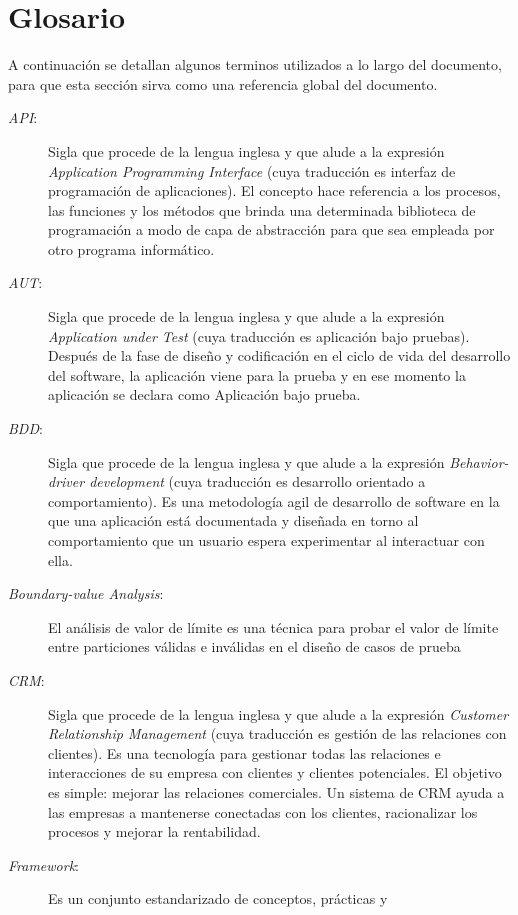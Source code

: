 \chapter{Glosario}\label{appendix_glossary}
A continuación se detallan algunos terminos utilizados a lo largo del
documento, para que esta sección sirva como una referencia global del documento.

\begin{description}
\item [\emph{API}:] Sigla que procede de la lengua inglesa y que alude a la
    expresión \emph{Application Programming Interface} (cuya traducción es
    interfaz de programación de aplicaciones). El concepto hace referencia a los
    procesos, las funciones y los métodos que brinda una determinada biblioteca
    de programación a modo de capa de abstracción para que sea empleada por otro
    programa informático.
\item [\emph{AUT}:] Sigla que procede de la lengua inglesa y que alude a la
    expresión \emph{Application under Test} (cuya traducción es aplicación bajo
    pruebas). Después de la fase de diseño y codificación en el ciclo de vida
    del desarrollo del software, la aplicación viene para la prueba y en ese
    momento la aplicación se declara como Aplicación bajo prueba.
\item [\emph{BDD}:] Sigla que procede de la lengua inglesa y que alude a la
    expresión \emph{Behavior-driver development} (cuya traducción es desarrollo
    orientado a comportamiento). Es una metodología agil de desarrollo de
    software en la que una aplicación está documentada y diseñada en torno al
    comportamiento que un usuario espera experimentar al interactuar con ella.
\item [\emph{Boundary-value Analysis}:] El análisis de valor de límite es una
    técnica para probar el valor de límite entre particiones válidas e inválidas
    en el diseño de casos de prueba
\item [\emph{CRM}:] Sigla que procede de la lengua inglesa y que alude a la
    expresión \emph{Customer Relationship Management} (cuya traducción es
    gestión de las relaciones con clientes). Es una tecnología para gestionar
    todas las relaciones e interacciones de su empresa con clientes y clientes
    potenciales. El objetivo es simple: mejorar las relaciones comerciales. Un
    sistema de CRM ayuda a las empresas a mantenerse conectadas con los
    clientes, racionalizar los procesos y mejorar la rentabilidad.
\item [\emph{Framework}:] Es un conjunto estandarizado de conceptos, prácticas y

\end{description}
